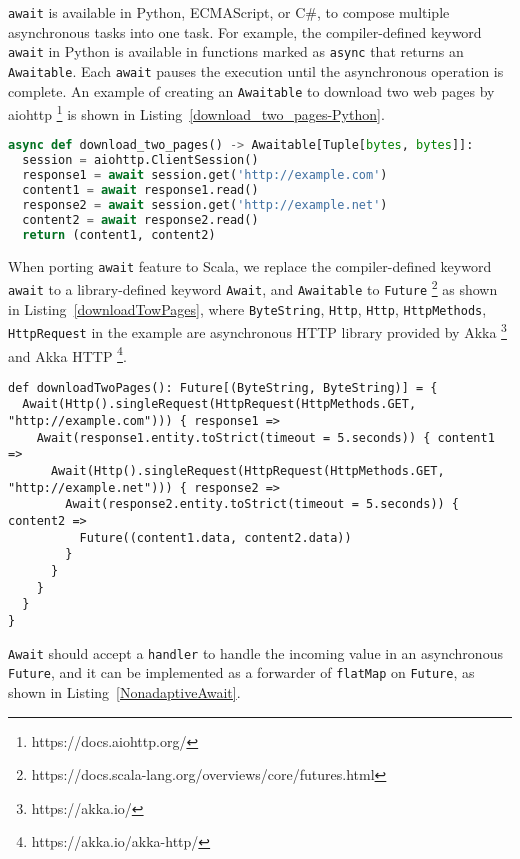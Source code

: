 \lstinline{await} is available in Python, ECMAScript, or C\#, to compose multiple asynchronous tasks into one task. For example, the compiler-defined keyword \lstinline{await} in Python is available in functions marked as \lstinline{async} that returns an \lstinline{Awaitable}. Each \lstinline{await} pauses the execution until the asynchronous operation is complete. An example of creating an \lstinline{Awaitable} to download two web pages by aiohttp \footnote{https://docs.aiohttp.org/} is shown in Listing~\ref{download_two_pages-Python}.

\begin{lstlisting}[language=Python,style=Python3,caption={Asynchronously downloading two web pages in Python},label={download_two_pages-Python}]
async def download_two_pages() -> Awaitable[Tuple[bytes, bytes]]:
  session = aiohttp.ClientSession()
  response1 = await session.get('http://example.com')
  content1 = await response1.read()
  response2 = await session.get('http://example.net')
  content2 = await response2.read()
  return (content1, content2)
\end{lstlisting}

When porting \lstinline{await} feature to Scala, we replace the compiler-defined keyword \lstinline{await} to a library-defined keyword \lstinline{Await}, and \lstinline{Awaitable} to \lstinline{Future} \footnote{https://docs.scala-lang.org/overviews/core/futures.html} as shown in Listing~\ref{downloadTowPages}, where \lstinline{ByteString}, \lstinline{Http}, \lstinline{Http}, \lstinline{HttpMethods}, \lstinline{HttpRequest} in the example are asynchronous HTTP library provided by Akka \footnote{https://akka.io/} and Akka HTTP \footnote{https://akka.io/akka-http/}.

\begin{lstlisting}[caption={Asynchronously downloading two web pages in \textit{Dsl.scala} },label={downloadTowPages}]
def downloadTwoPages(): Future[(ByteString, ByteString)] = {
  Await(Http().singleRequest(HttpRequest(HttpMethods.GET, "http://example.com"))) { response1 =>
    Await(response1.entity.toStrict(timeout = 5.seconds)) { content1 =>
      Await(Http().singleRequest(HttpRequest(HttpMethods.GET, "http://example.net"))) { response2 =>
        Await(response2.entity.toStrict(timeout = 5.seconds)) { content2 =>
          Future((content1.data, content2.data))
        }
      }
    }
  }
}
\end{lstlisting}

\lstinline{Await} should accept a \lstinline{handler} to handle the incoming value in an asynchronous \lstinline{Future}, and it can be implemented as a forwarder of \lstinline{flatMap} on \lstinline{Future}, as shown in Listing~\ref{NonadaptiveAwait}.

